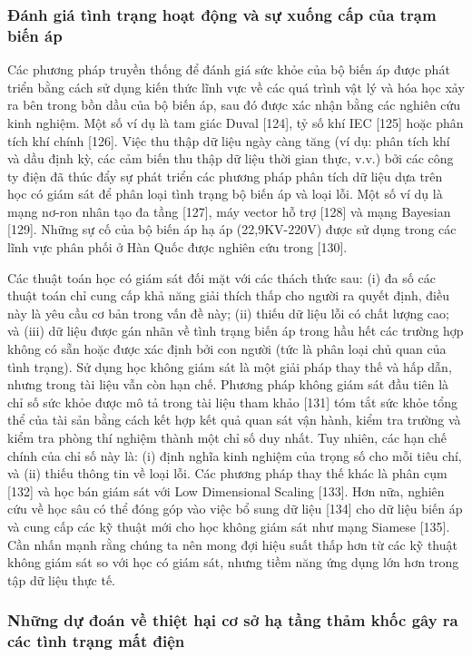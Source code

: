 \documentclass[utf8]{frontiersSCNS} %
\begin{document}
\subsubsection{Đánh giá tình trạng hoạt động và sự xuống cấp của trạm biến áp}

Các phương pháp truyền thống để đánh giá sức khỏe của bộ biến áp được phát triển bằng cách sử dụng kiến thức lĩnh vực về các quá trình vật lý và hóa học xảy ra bên trong bồn dầu của bộ biến áp, sau đó được xác nhận bằng các nghiên cứu kinh nghiệm. Một số ví dụ là tam giác Duval [124], tỷ số khí IEC [125] hoặc phân tích khí chính [126]. Việc thu thập dữ liệu ngày càng tăng (ví dụ: phân tích khí và dầu định kỳ, các cảm biến thu thập dữ liệu thời gian thực, v.v.) bởi các công ty điện đã thúc đẩy sự phát triển các phương pháp phân tích dữ liệu dựa trên học có giám sát để phân loại tình trạng bộ biến áp và loại lỗi. Một số ví dụ là mạng nơ-ron nhân tạo đa tầng [127], máy vector hỗ trợ [128] và mạng Bayesian [129]. Những sự cố của bộ biến áp hạ áp (22,9KV-220V) được sử dụng trong các lĩnh vực phân phối ở Hàn Quốc được nghiên cứu trong [130].

Các thuật toán học có giám sát đối mặt với các thách thức sau: (i) đa số các thuật toán chỉ cung cấp khả năng giải thích thấp cho người ra quyết định, điều này là yêu cầu cơ bản trong vấn đề này; (ii) thiếu dữ liệu lỗi có chất lượng cao; và (iii) dữ liệu được gán nhãn về tình trạng biến áp trong hầu hết các trường hợp không có sẵn hoặc được xác định bởi con người (tức là phân loại chủ quan của tình trạng). Sử dụng học không giám sát là một giải pháp thay thế và hấp dẫn, nhưng trong tài liệu vẫn còn hạn chế. Phương pháp không giám sát đầu tiên là chỉ số sức khỏe được mô tả trong tài liệu tham khảo [131] tóm tắt sức khỏe tổng thể của tài sản bằng cách kết hợp kết quả quan sát vận hành, kiểm tra trường và kiểm tra phòng thí nghiệm thành một chỉ số duy nhất. Tuy nhiên, các hạn chế chính của chỉ số này là: (i) định nghĩa kinh nghiệm của trọng số cho mỗi tiêu chí, và (ii) thiếu thông tin về loại lỗi. Các phương pháp thay thế khác là phân cụm [132] và học bán giám sát với Low Dimensional Scaling [133]. Hơn nữa, nghiên cứu về học sâu có thể đóng góp vào việc bổ sung dữ liệu [134] cho dữ liệu biến áp và cung cấp các kỹ thuật mới cho học không giám sát như mạng Siamese [135]. Cần nhấn mạnh rằng chúng ta nên mong đợi hiệu suất thấp hơn từ các kỹ thuật không giám sát so với học có giám sát, nhưng tiềm năng ứng dụng lớn hơn trong tập dữ liệu thực tế.


\subsubsection{Những dự đoán về thiệt hại cơ sở hạ tầng thảm khốc gây ra các tình trạng mất điện}
\end{document}
